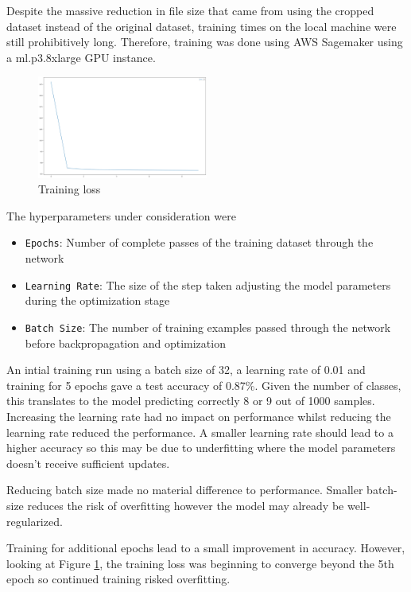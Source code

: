\documentclass{article}
\begin{document}
Despite the massive reduction in file size that came from using the cropped dataset instead of the original dataset, training times on the local machine were still prohibitively long. Therefore, training was done using AWS Sagemaker using a ml.p3.8xlarge GPU instance.

\begin{figure}
    \centering
    \includegraphics[width=0.5\textwidth]{train_loss.png}
    \caption{Training loss}
    \label{fig:training_loss}
\end{figure}

The hyperparameters under consideration were

\begin{itemize}
    \item \verb|Epochs|: Number of complete passes of the training dataset through the network
    \item \verb|Learning Rate|: The size of the step taken adjusting the model parameters during the optimization stage
    \item \verb|Batch Size|: The number of training examples passed through the network before backpropagation and optimization
\end{itemize}

An intial training run using a batch size of 32, a learning rate of 0.01 and training for 5 epochs gave a test accuracy of 0.87\%. Given the number of classes, this translates to the model predicting correctly 8 or 9 out of 1000 samples.
Increasing the learning rate had no impact on performance whilst reducing the learning rate reduced the performance. A smaller learning rate should lead to a higher accuracy \cite{smith2018dont} so this may be due to underfitting where the model parameters doesn't receive sufficient updates.


Reducing batch size made no material difference to performance. Smaller batch-size reduces the risk of overfitting however the model may already be well-regularized.

Training for additional epochs lead to a small improvement in accuracy. However, looking at Figure \ref{fig:training_loss}, the training loss was beginning to converge beyond the 5th epoch so continued training risked overfitting.
\end{document}
